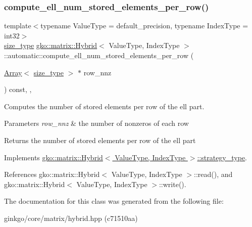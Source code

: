 \subsubsection{\texorpdfstring{compute\+\_\+ell\+\_\+num\+\_\+stored\+\_\+elements\+\_\+per\+\_\+row()}{compute\_ell\_num\_stored\_elements\_per\_row()}}
{\footnotesize\ttfamily template$<$typename Value\+Type = default\+\_\+precision, typename Index\+Type = int32$>$ \\
\hyperlink{namespacegko_a6e5c95df0ae4e47aab2f604a22d98ee7}{size\+\_\+type} \hyperlink{classgko_1_1matrix_1_1Hybrid}{gko\+::matrix\+::\+Hybrid}$<$ Value\+Type, Index\+Type $>$\+::automatic\+::compute\+\_\+ell\+\_\+num\+\_\+stored\+\_\+elements\+\_\+per\+\_\+row (\begin{DoxyParamCaption}\item[{\hyperlink{classgko_1_1Array}{Array}$<$ \hyperlink{namespacegko_a6e5c95df0ae4e47aab2f604a22d98ee7}{size\+\_\+type} $>$ $\ast$}]{row\+\_\+nnz }\end{DoxyParamCaption}) const\hspace{0.3cm}{\ttfamily [inline]}, {\ttfamily [override]}, {\ttfamily [virtual]}}



Computes the number of stored elements per row of the ell part. 


\begin{DoxyParams}{Parameters}
{\em row\+\_\+nnz} & the number of nonzeros of each row\\
\hline
\end{DoxyParams}
\begin{DoxyReturn}{Returns}
the number of stored elements per row of the ell part 
\end{DoxyReturn}


Implements \hyperlink{classgko_1_1matrix_1_1Hybrid_1_1strategy__type_a0a0cd4024f27c7d0f286f35fc0a6de60}{gko\+::matrix\+::\+Hybrid$<$ Value\+Type, Index\+Type $>$\+::strategy\+\_\+type}.



References gko\+::matrix\+::\+Hybrid$<$ Value\+Type, Index\+Type $>$\+::read(), and gko\+::matrix\+::\+Hybrid$<$ Value\+Type, Index\+Type $>$\+::write().



The documentation for this class was generated from the following file\+:\begin{DoxyCompactItemize}
\item 
ginkgo/core/matrix/hybrid.\+hpp (c71510aa)\end{DoxyCompactItemize}
